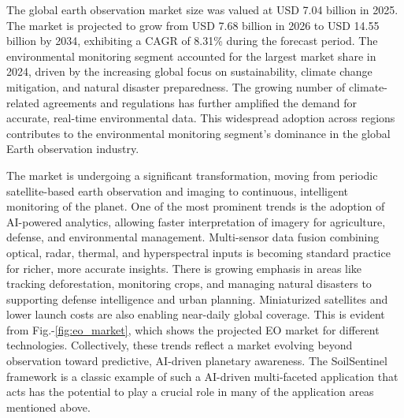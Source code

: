 \documentclass[11pt,letterpaper]{article}
\theoremstyle{plain}
\theoremstyle{definition}
\theoremstyle{remark}
\begin{document}
The global earth observation market size was valued at USD 7.04 billion in 2025. The market is projected to grow from USD 7.68 billion in 2026 to USD 14.55 billion by 2034, exhibiting a CAGR of 8.31\% during the forecast period. The environmental monitoring segment accounted for the largest market share in 2024, driven by the increasing global focus on sustainability, climate change mitigation, and natural disaster preparedness. The growing number of climate-related agreements and regulations has further amplified the demand for accurate, real-time environmental data. This widespread adoption across regions contributes to the environmental monitoring segment's dominance in the global Earth observation industry.



The market is undergoing a significant transformation, moving from periodic satellite-based earth observation and imaging to continuous, intelligent monitoring of the planet. One of the most prominent trends is the adoption of AI-powered analytics, allowing faster interpretation of imagery for agriculture, defense, and environmental management. Multi-sensor data fusion combining optical, radar, thermal, and hyperspectral inputs is becoming standard practice for richer, more accurate insights. There is growing emphasis in areas like tracking deforestation, monitoring crops, and managing natural disasters to supporting defense intelligence and urban planning. Miniaturized satellites and lower launch costs are also enabling near-daily global coverage. This is evident from Fig.-\ref{fig:eo_market}, which shows the projected EO market for different technologies. Collectively, these trends reflect a market evolving beyond observation toward predictive, AI-driven planetary awareness. The SoilSentinel framework is a classic example of such a AI-driven multi-faceted application that acts has the potential to play a crucial role in many of the application areas mentioned above.

\end{document}

